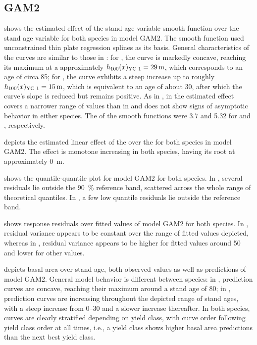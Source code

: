 \subsection{GAM2}

 shows the estimated effect of the stand age variable smooth function over the stand age variable for both species in model GAM2.  The smooth function used unconstrained thin plate regression splines as its basis.  General characteristics of the curves are similar to those in :  for \Beech{}, the curve is markedly concave, reaching its maximum at a approximately \(h_{100}(x)_{\text{YC 1}}{} = \SI{29}{\meter}\), which corresponds to an age of circa \SI{85}{\year};  for \Spruce{}, the curve exhibits a steep increase up to roughly \(h_{100}(x)_{\text{YC 1}}{} = \SI{15}{\meter}\), which is equivalent to an age of about \SI{30}{\year}, after which the curve’s slope is reduced but remains positive.  As in , in \Beech{} the estimated effect covers a narrower range of values than in \Spruce{} and does not show signs of asymptotic behavior in either species.  The \edf{} of the smooth functions were \num{3.7} and \num{5.32} for \Beech{} and \Spruce{}, respectively.

 depicts the estimated linear effect of the \ProductivityIndexVariableText{} over the \ProductivityIndexVariableText{} for both species in model GAM2.  The effect is monotone increasing in both species, having its root at approximately \SI{0}{\meter}.

 shows the quantile-quantile plot for model GAM2 for both species.  In \Beech{}, several residuals lie outside the \SI{90}{\percent} reference band, scattered across the whole range of theoretical quantiles.  In \Spruce{}, a few  low quantile residuals lie outside the reference band.

 shows response residuals over fitted values of model GAM2 for both species.   In \Beech{}, residual variance appears to be constant over the range of fitted values depicted, whereas in \Spruce{}, residual variance appears to be higher for fitted values around \num{50} and lower for other values.

 depicts basal area over stand age, both observed values as well as predictions of model GAM2.  General model behavior is different between species:  in \Beech{}, prediction curves are concave, reaching their maximum around a stand age of \SI{80}{\year};  in \Spruce{}, prediction curves are increasing throughout the depicted range of stand ages, with a steep increase from \SIrange{0}{30}{\year} and a slower increase thereafter.  In both species, curves are clearly stratified depending on yield class, with curve order following yield class order at all times, i.e., a yield class shows higher basal area predictions than the next best yield class.

